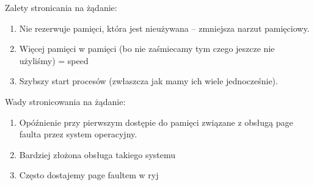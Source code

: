 Zalety stronicania na żądanie:
\begin{enumerate}
	\item Nie rezerwuje pamięci, która jest nieużywana -- zmniejsza narzut pamięciowy.
	\item Więcej pamięci w pamięci (bo nie zaśmiecamy tym czego jeszcze nie użyliśmy) = speed
	\item Szybszy start procesów (zwłaszcza jak mamy ich wiele jednocześnie).
\end{enumerate}

Wady stronicowania na żądanie:
\begin{enumerate}
	\item Opóźnienie przy pierwszym dostępie do pamięci związane z obsługą page faulta przez system operacyjny.
	\item Bardziej złożona obsługa takiego systemu
	\item Często dostajemy page faultem w ryj
\end{enumerate}